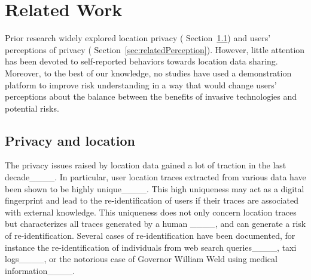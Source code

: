 \section{Related Work}
\label{sec:related}


Prior research widely 
explored location privacy (%
Section~\ref{sec:relatedPrivacy}) and users' perceptions of privacy (%
Section~\ref{sec:relatedPerception}).
However, little attention has been devoted to self-reported behaviors towards location data sharing. Moreover, to the best of our knowledge, no studies have used a demonstration platform to improve risk understanding in a way that would change users’ perceptions about the balance between the benefits of invasive technologies and potential risks.

\subsection{Privacy and location}
\label{sec:relatedPrivacy}

The privacy issues raised by location data gained a lot of traction in the last decade____. 
In particular, user location traces extracted from various data have been shown to be highly unique____. %
This high uniqueness may act as a digital fingerprint and lead to the re-identification of users if their traces are associated with external knowledge.
This uniqueness does not only concern location traces but characterizes all traces generated by a human ____, and can generate a risk of re-identification.
Several cases of re-identification have been documented, for instance the re-identification of individuals from web search queries____,  %
taxi logs____, or the notorious case of Governor William Weld using medical information____.

